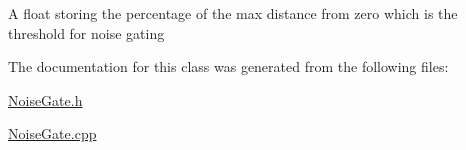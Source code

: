 A float storing the percentage of the max distance from zero which is the threshold for noise gating 

The documentation for this class was generated from the following files\+:\begin{DoxyCompactItemize}
\item 
\hyperlink{NoiseGate_8h}{Noise\+Gate.\+h}\item 
\hyperlink{NoiseGate_8cpp}{Noise\+Gate.\+cpp}\end{DoxyCompactItemize}
